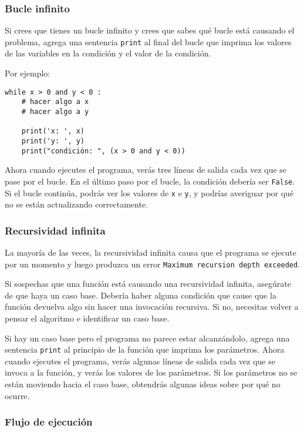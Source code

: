 \documentclass[10pt]{book}
\begin{document}
\subsubsection{Bucle infinito}

Si crees que tienes un bucle infinito y crees que sabes
qué bucle está causando el problema, agrega una sentencia {\tt print}
al final del bucle que imprima los valores de las variables en
la condición y el valor de la condición.

Por ejemplo:

\begin{verbatim}
while x > 0 and y < 0 :
    # hacer algo a x
    # hacer algo a y 

    print('x: ', x)
    print('y: ', y)
    print("condición: ", (x > 0 and y < 0))
\end{verbatim}
%
Ahora cuando ejecutes el programa, verás tres líneas de salida
cada vez que se pase por el bucle.  En el último paso por el
bucle, la condición debería ser {\tt False}.  Si el bucle
continúa, podrás ver los valores de {\tt x} e {\tt y},
y podrías averiguar por qué no se están actualizando correctamente.


\subsubsection{Recursividad infinita}

La mayoría de las veces, la recursividad infinita causa que el programa se
ejecute por un momento y luego produzca un error
{\tt Maximum recursion depth exceeded}.

Si sospechas que una función está causando una recursividad
infinita, asegúrate de que haya un caso base.
Debería haber alguna condición que cause que la
función devuelva algo sin hacer una invocación recursiva.
Si no, necesitas volver a pensar el algoritmo e identificar un caso
base.

Si hay un caso base pero el programa no parece estar alcanzándolo,
agrega una sentencia {\tt print} al principio de la función
que imprima los parámetros.  Ahora cuando ejecutes el programa, verás
algunas líneas de salida cada vez que se invoca a la función,
y verás los valores de los parámetros.  Si los parámetros no se están moviendo
hacia el caso base, obtendrás algunas ideas sobre por qué no ocurre.


\subsubsection{Flujo de ejecución}
\end{document}
